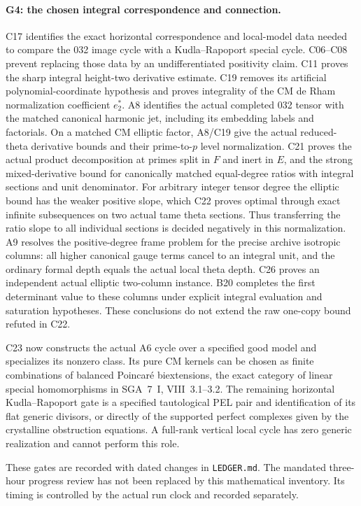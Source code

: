 \paragraph{G4: the chosen integral correspondence and connection.}
C17 identifies the exact horizontal correspondence and local-model
data needed to compare the 032 image cycle with a Kudla--Rapoport
special cycle. C06--C08 prevent replacing those data by an
undifferentiated positivity claim. C11 proves the sharp integral
height-two derivative estimate. C19 removes its artificial
polynomial-coordinate hypothesis and proves integrality of the
CM de Rham normalization coefficient $e_2^*$.
A8 identifies the actual completed 032 tensor with the matched
canonical harmonic jet, including its embedding labels and
factorials. On a matched CM elliptic factor, A8/C19 give the
actual reduced-theta derivative bounds and their prime-to-$p$
level normalization. C21 proves the actual product decomposition
at primes split in $F$ and inert in $E$, and the strong
mixed-derivative bound for canonically matched equal-degree
ratios with integral sections and unit denominator.
For arbitrary integer tensor degree the elliptic bound has
the weaker positive slope, which C22 proves optimal through
exact infinite subsequences on two actual tame theta sections.
Thus transferring the ratio slope to all individual sections
is decided negatively in this normalization.
A9 resolves the positive-degree frame problem for the precise
archive isotropic columns: all higher canonical gauge terms
cancel to an integral unit, and the ordinary formal depth
equals the actual local theta depth. C26 proves an independent
actual elliptic two-column instance. B20 completes the first
determinant value to these columns under explicit integral
evaluation and saturation hypotheses. These conclusions do
not extend the raw one-copy bound refuted in C22.

C23 now constructs the actual A6 cycle over a specified good
model and specializes its nonzero class. Its pure CM kernels
can be chosen as finite combinations of balanced Poincar\'e
biextensions, the exact category of linear special homomorphisms
in SGA~7~I, VIII~3.1--3.2. The remaining horizontal
Kudla--Rapoport gate is a specified tautological PEL pair and
identification of its flat generic divisors, or directly of
the supported perfect complexes given by the crystalline
obstruction equations. A full-rank vertical local cycle has
zero generic realization and cannot perform this role.

These gates are recorded with dated changes in \texttt{LEDGER.md}.
The mandated three-hour progress review has not been replaced by
this mathematical inventory. Its timing is controlled by the actual
run clock and recorded separately.
